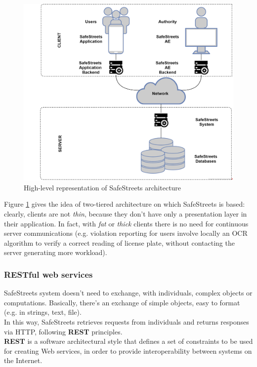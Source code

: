 \documentclass{article}
\begin{document}
				\begin{figure}[H]
					\includegraphics [scale=0.7] {diagrams/tieredArchitecture.png}
					\caption[Architecture]{High-level representation of SafeStreets architecture}
					\label{fig:tieredArchitecture}
				\end{figure}
			
				Figure \ref{fig:tieredArchitecture} gives the idea of two-tiered architecture on which SafeStreets is based: clearly, clients are not \textit{thin}, because they don't have only a presentation layer in their application.
				In fact, with \textit{fat} or \textit{thick} clients there is no need for continuous server communications (e.g. violation reporting for users involve locally an OCR algorithm to verify a correct reading of license plate, without contacting the server generating more workload).
			
			\subsubsection{RESTful web services}
				SafeStreets system doesn't need to exchange, with individuals, complex objects or computations. Basically, there's an exchange of simple objects, easy to format (e.g. in strings, text, file).\\
				In this way, SafeStreets retrieves requests from individuals and returns responses via HTTP, following \textbf{REST} principles.\\
				\textbf{REST} is a software architectural style that defines a set of constraints to be used for creating Web services, in order to provide interoperability between systems on the Internet. 
				
\end{document}
